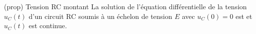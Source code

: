 \documentclass[../../main/main.tex]{subfiles}
\begin{document}
\begin{tcb*}[label=prop:ucsolu, sidebyside, righthand ratio=.3](prop)
	{Tension RC montant}
	La solution de l'équation différentielle de la tension $u_C(t)$
	d'un circuit RC soumis à un échelon de tension $E$ avec
	$u_C(0) = 0$ est
	\psw{%
		\[
			\boxed{u_C(t) = E\left(1-\exp\left(-\frac{t}{\tau}\right)\right)}
		\]
	}%
	et $u_C(t)$ est continue.
	\vspace{-15pt}
	\tcblower
	\begin{center}
	\end{center}
\end{tcb*}
\end{document}
